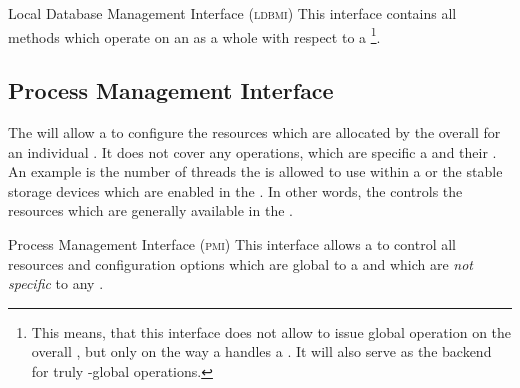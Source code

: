 \documentclass[a4paper, 12pt]{book}
\begin{document}

\newcommand{\LDBMI}{{\normalfont\textsc{ldbmi}}\xspace}

\begin{definition*}{Local Database Management Interface (\LDBMI)}
  \label{def:local-database-management-interface}
  This interface contains all methods which operate on an 
  as a whole with respect to a \footnote{This means,
  that this interface does not allow to issue global operation on the overall
  , but only on the way a  handles a
  . It will also serve as the backend for truly
  -global operations.}.
\end{definition*}


\subsection{Process Management Interface}

The  will allow a  to
configure the resources which are allocated by the overall
\SYNEIGHT for an individual . It does
not cover any operations, which are specific a  and
their .\\ 
An example is the number of threads the \SYNEIGHT is allowed to
use within a  or the stable storage devices
which are enabled in the . In other words, the  controls the resources which are generally
available in the .

\newcommand{\PMI}{{\normalfont\textsc{pmi}}\xspace}

\begin{definition*}{Process Management Interface (\PMI)}
  This interface allows a  to control all resources and
  configuration options which are global to a  and which are \emph{not specific} to any .
\end{definition*}
\end{document}
